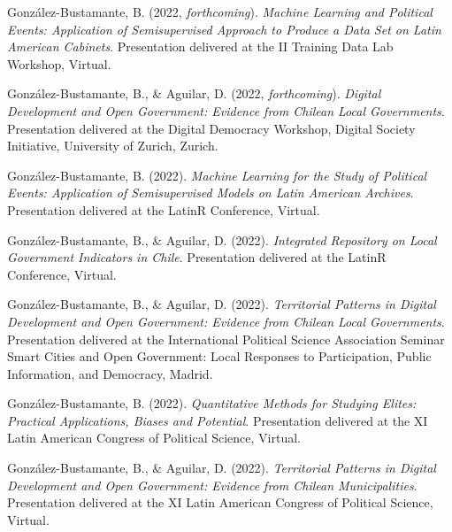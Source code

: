 \begin{publications}

\begin{benumerate}{77}

\item{González-Bustamante, B. (2022, {\itshape forthcoming}). {\itshape Machine Learning and Political Events: Application of Semisupervised Approach to Produce a Data Set on Latin American Cabinets}. Presentation delivered at the II Training Data Lab Workshop, Virtual.}\vspace{1mm}

\item{González-Bustamante, B., \& Aguilar, D. (2022, {\itshape forthcoming}). {\itshape Digital Development and Open Government: Evidence from Chilean Local Governments}. Presentation delivered at the Digital Democracy Workshop, Digital Society Initiative, University of Zurich, Zurich.}\vspace{1mm}

\item{González-Bustamante, B. (2022). {\itshape Machine Learning for the Study of Political Events: Application of Semisupervised Models on Latin American Archives}. Presentation delivered at the LatinR Conference, Virtual.}\vspace{1mm}

\item{González-Bustamante, B., \& Aguilar, D. (2022). {\itshape Integrated Repository on Local Government Indicators in Chile}. Presentation delivered at the LatinR Conference, Virtual.}\vspace{1mm}

\item{González-Bustamante, B., \& Aguilar, D. (2022). {\itshape Territorial Patterns in Digital Development and Open Government: Evidence from Chilean Local Governments}. Presentation delivered at the International Political Science Association Seminar Smart Cities and Open Government: Local Responses to Participation, Public Information, and Democracy, Madrid.}\vspace{1mm}

\item{\small González-Bustamante, B. (2022). {\itshape Quantitative Methods for Studying Elites: Practical Applications, Biases and Potential}. Presentation delivered at the XI Latin American Congress of Political Science, Virtual.}\vspace{1mm}

\item{\small González-Bustamante, B., \& Aguilar, D. (2022). {\itshape Territorial Patterns in Digital Development and Open Government: Evidence from Chilean Municipalities}. Presentation delivered at the XI Latin American Congress of Political Science, Virtual.}\vspace{1mm}


\end{benumerate}
\end{publications}
